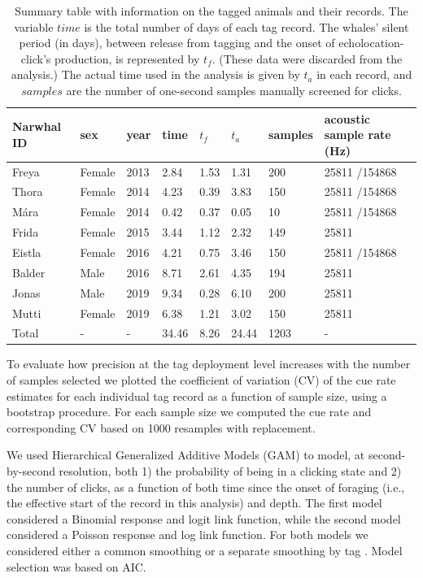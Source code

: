 \documentclass[preprint]{JASA}
\begin{document}
\begin{table}[ht]
\caption{\label{tab:TAB1}{Summary table with information on the tagged animals and their records. The variable $time$ is the total number of days of each tag record. The whales’ silent period (in days), between release from tagging and the onset of echolocation-click's production, is represented by $t_f$. (These data were discarded from the analysis.) The actual time used in the analysis is given by $t_a$ in each record, and $samples$ are the number of one-second samples manually screened for clicks.}}
\vskip3pt
\begin{tabular}{p{2.5cm}p{1.5cm}p{1cm}p{1cm}p{1cm}p{1cm}p{2cm}p{5cm}}
\hline\hline
 Narwhal ID&sex&year&time&$t_f$&$t_a$&samples&acoustic sample rate (Hz)\\
\hline
Freya & Female & 2013 & 2.84 & 1.53 & 1.31 & 200 & 25811 /154868 \\
Thora & Female & 2014 & 4.23 & 0.39 &  3.83 & 150 & 25811 /154868 \\
Mára & Female & 2014 & 0.42 & 0.37 &  0.05 & 10 & 25811 /154868\\
Frida & Female & 2015 & 3.44 & 1.12 & 2.32 & 149 & 25811 \\
Eistla & Female & 2016 & 4.21 & 0.75 &  3.46 & 150 & 25811 /154868 \\
Balder & Male & 2016  & 8.71 & 2.61 & 4.35 & 194 & 25811\\
Jonas & Male & 2019 & 9.34 & 0.28 & 6.10 & 200 & 25811 \\
Mutti & Female & 2019 & 6.38 & 1.21 & 3.02 & 150 & 25811 \\
\hline
Total & - & - & 34.46 & 8.26 & 24.44 & 1203 & - \\
\hline\hline
\end{tabular}
\end{table}

To evaluate how precision at the tag deployment level increases with the number of samples selected we plotted the coefficient of variation (CV) of the cue rate estimates for each individual tag record as a function of sample size, using a bootstrap procedure. For each sample size we computed the cue rate and corresponding CV based on 1000 resamples with replacement.

We used Hierarchical Generalized Additive Models (GAM) \citep{wood2011} to model, at second-by-second resolution, both 1) the probability of being in a clicking state and 2) the number of clicks, as a function of both time since the onset of foraging (i.e., the effective start of the record in this analysis) and depth. The first model considered a Binomial response and logit link function, while the second model considered a Poisson response and log link function. For both models we considered either a common smoothing or a separate smoothing by tag \citep{Pedersen2019}. Model selection was based on AIC. %
\end{document}
